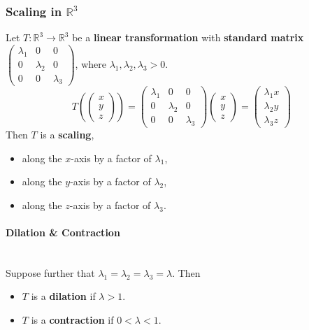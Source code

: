 \documentclass[../ma2001_notes.tex]{subfiles}
\begin{document}
\subsubsection{Scaling in $\mathbb{R}^3$}
Let \(T:\mathbb{R}^3\to\mathbb{R}^3\) be a \textbf{linear transformation} with \textbf{standard matrix} \(\begin{pmatrix}
	\lambda_1 & 0 & 0 \\
	0 & \lambda_2 & 0 \\
	0 & 0 & \lambda_3
\end{pmatrix}\), where \(\lambda_1,\lambda_2,\lambda_3>0\).
\[T\left(\begin{pmatrix}
	x \\ y \\ z
\end{pmatrix}\right)=\begin{pmatrix}
	\lambda_1 & 0 & 0 \\
	0 & \lambda_2 & 0 \\
	0 & 0 & \lambda_3
\end{pmatrix}\begin{pmatrix}
	x \\ y \\ z
\end{pmatrix}=\begin{pmatrix}
	\lambda_1x \\ \lambda_2y \\ \lambda_3z
\end{pmatrix}\]
Then \(T\) is a \textbf{scaling},
\begin{itemize}
	\item along the \(x\)-axis by a factor of \(\lambda_1\),
	\item along the \(y\)-axis by a factor of \(\lambda_2\),
	\item along the \(z\)-axis by a factor of \(\lambda_3\).
\end{itemize}


\paragraph{Dilation \& Contraction}\,\\
Suppose further that \(\lambda_1=\lambda_2=\lambda_3=\lambda\). Then
\begin{itemize}
	\item\(T\) is a \textbf{dilation} if \(\lambda>1\).
	\item\(T\) is a \textbf{contraction} if \(0<\lambda<1\).
\end{itemize}
\end{document}

